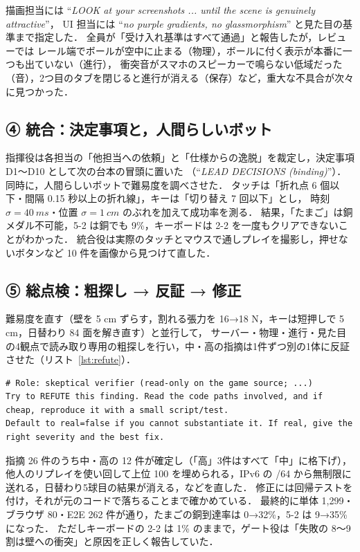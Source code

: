\documentclass[a4paper,twocolumn,10pt]{ltjsarticle}
\newcommand{\lstref}[1]{リスト~\ref{#1}}
\begin{document}
描画担当には ``\textit{LOOK at your screenshots ... until the scene is genuinely attractive}''，
UI 担当には ``\textit{no purple gradients, no glassmorphism}'' と見た目の基準まで指定した．
全員が「受け入れ基準はすべて通過」と報告したが，レビューでは
レール端でボールが空中に止まる（物理），ボールに付く表示が本番に一つも出ていない（進行），
衝突音がスマホのスピーカーで鳴らない低域だった（音），2つ目のタブを閉じると進行が消える（保存）など，重大な不具合が次々に見つかった．

\subsection{④ 統合：決定事項と，人間らしいボット}
指揮役は各担当の「他担当への依頼」と「仕様からの逸脱」を裁定し，決定事項 D1〜D10 として次の台本の冒頭に置いた
（``\textit{LEAD DECISIONS (binding)}''）．同時に，人間らしいボットで難易度を調べさせた．
タッチは「折れ点 6 個以下・間隔 0.15 秒以上の折れ線」，キーは「切り替え 7 回以下」とし，
時刻 $\sigma=\SI{40}{ms}$・位置 $\sigma=\SI{1}{cm}$ のぶれを加えて成功率を測る．
結果，「たまご」は銅メダル不可能，5-2 は銅でも 9\%，キーボードは 2-2 を一度もクリアできないことがわかった．
統合役は実際のタッチとマウスで通しプレイを撮影し，押せないボタンなど 10 件を画像から見つけて直した．

\subsection{⑤ 総点検：粗探し → 反証 → 修正}
難易度を直す（壁を 5 cm ずらす，割れる張力を 16→18 N，キーは短押しで 5 cm，日替わり 84 面を解き直す）と並行して，
サーバー・物理・進行・見た目の4観点で読み取り専用の粗探しを行い，中・高の指摘は1件ずつ別の1体に反証させた（\lstref{lst:refute}）．

\begin{lstlisting}[caption={反証役へのプロンプト（全文）},label={lst:refute}]
# Role: skeptical verifier (read-only on the game source; ...)
Try to REFUTE this finding. Read the code paths involved, and if cheap, reproduce it with a small script/test.
Default to real=false if you cannot substantiate it. If real, give the right severity and the best fix.
\end{lstlisting}

指摘 26 件のうち中・高の 12 件が確定し（「高」3件はすべて「中」に格下げ），
他人のリプレイを使い回して上位 100 を埋められる，IPv6 の /64 から無制限に送れる，日替わり5球目の結果が消える，などを直した．
修正には回帰テストを付け，それが元のコードで落ちることまで確かめている．
最終的に単体 1,299・ブラウザ 80・E2E 262 件が通り，たまごの銅到達率は 0→32\%，5-2 は 9→35\% になった．
ただしキーボードの 2-2 は 1\% のままで，ゲート役は「失敗の 8〜9 割は壁への衝突」と原因を正しく報告していた．
\end{document}
